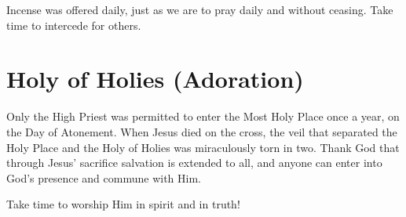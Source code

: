 Incense was offered daily, just as we are to pray daily and without ceasing.
Take time to intercede for others.


\section{Holy of Holies (Adoration)}

Only the High Priest was permitted to enter the Most Holy Place
once a year, on the Day of Atonement.
When Jesus died on the cross, the veil that separated the Holy Place
and the Holy of Holies was miraculously torn in two.
Thank God that through Jesus' sacrifice salvation is extended to all,
and anyone can enter into God’s presence and commune with Him.

Take time to worship Him in spirit and in truth!
